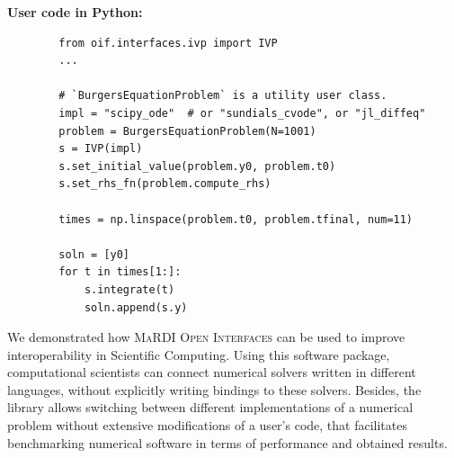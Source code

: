 \documentclass[a0paper, twocolumn, csc, english, final]{mpi2015_poster}
\newcommand{\OIF}{\textsc{MaRDI Open Interfaces}\xspace}
\begin{document}
\begin{poster}
\begin{pcolumn}
\begin{pbox}
      \vspace{0em}
      \textbf{User code in Python:}
      \begin{verbatim}
        from oif.interfaces.ivp import IVP
        ...

        # `BurgersEquationProblem` is a utility user class.
        impl = "scipy_ode"  # or "sundials_cvode", or "jl_diffeq"
        problem = BurgersEquationProblem(N=1001)
        s = IVP(impl)
        s.set_initial_value(problem.y0, problem.t0)
        s.set_rhs_fn(problem.compute_rhs)

        times = np.linspace(problem.t0, problem.tfinal, num=11)

        soln = [y0]
        for t in times[1:]:
            s.integrate(t)
            soln.append(s.y)
      \end{verbatim}
    \end{pbox}
    \begin{pbox}
      \large
      We demonstrated how \OIF{} can be used to improve
      interoperability in Scientific Computing.
      Using this software package, computational scientists can connect numerical
      solvers written in different languages, without explicitly writing bindings
      to these solvers.
      Besides, the library allows switching between different implementations
      of a numerical problem without extensive modifications of a user's code,
      that facilitates benchmarking numerical software in terms of performance
      and obtained results.
    \end{pbox}
    \begin{pbox}
      \vspace{1em}
      \printbibliography[]
    \end{pbox}
  \end{pcolumn}
\end{poster}
\end{document}
